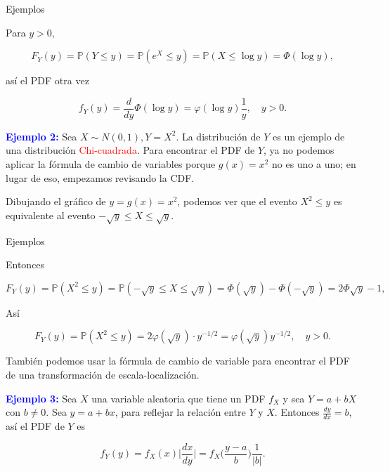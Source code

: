 \documentclass[10pt]{beamer}
\begin{document}
\begin{frame}{Ejemplos}
\small{ Para $y> 0$,
	
\[
F_Y(y) = \mathbb{P}(Y \leq y) = \mathbb{P}(e^X \leq y) = \mathbb{P}(X \leq \log y) = \Phi(\log y),
\]

as\'i el PDF otra vez

\[
f_Y(y) = \frac{d}{dy}\Phi(\log y) = \varphi(\log y)\frac{1}{y}, \quad y > 0.
\]

\textcolor{blue}{\textbf{Ejemplo 2:}} Sea $X \sim N(0, 1), Y = X^2$.  La distribuci\'on de $Y$ es un ejemplo de una distribuci\'on \textcolor{red}{Chi-cuadrada}. Para encontrar el PDF de $Y$, ya no podemos aplicar la f\'ormula de cambio de variables porque $g(x) = x^2$ no es uno a uno; en lugar de eso, empezamos revisando  la CDF.

Dibujando el gr\'afico de $y = g(x) = x^2$, podemos ver que el evento $X^2 \leq  y$ es equivalente al evento $-\sqrt{y} \leq X \leq \sqrt{y}$.
}
\end{frame}

\begin{frame}{Ejemplos}
\small{ Entonces
	
	\[
	F_Y(y) = \mathbb{P}(X^2 \leq y) = \mathbb{P}(-\sqrt{y} \leq X \leq \sqrt{y}) = \Phi(\sqrt{y}) - \Phi(-\sqrt{y}) = 2\Phi{\sqrt{y}} -1,
	\]
	
	
 As\'i

\[
F_Y(y) = \mathbb{P}(X^2 \leq y) = 2 \varphi(\sqrt{y})\cdot y^{-1/2} = \varphi(\sqrt{y})y^{-1/2}, \quad y > 0.
\]	

Tambi\'en podemos usar la f\'ormula de cambio de variable para encontrar el PDF de una transformaci\'on de escala-localizaci\'on.	

 \textcolor{blue}{\textbf{Ejemplo 3:}} Sea $X$ una variable aleatoria que tiene un PDF $f_X$ y sea $Y = a +bX$ con $b \neq 0$. Sea $y = a + bx$, para reflejar la relaci\'on entre $Y$ y $X$. Entonces $\frac{dy}{dx} = b$, as\'i el PDF de $Y$ es
 
 \[
 f_Y(y) = f_X(x)\biggl \vert \frac{dx}{dy}\biggr \vert = f_X\biggl(\frac{y -a}{b} \biggr)\frac{1}{\vert b\vert}.
 \]
	
}

\end{frame}
\end{document}
